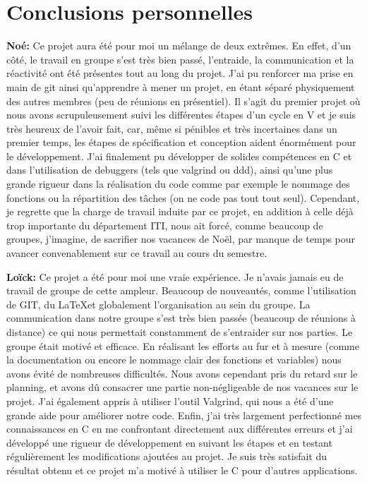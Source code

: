 \documentclass{article}
\begin{document}
\clearpage
\section{Conclusions personnelles}


\textbf{Noé:} 
Ce projet aura été pour moi un mélange de deux extrêmes.
En effet, d'un côté, le travail en groupe s'est très bien passé, l'entraide, la communication et la réactivité ont été présentes tout au long du projet.
J'ai pu renforcer ma prise en main de git ainsi qu'apprendre à mener un projet, en étant séparé physiquement des autres membres (peu de réunions en présentiel).
Il s'agit du premier projet où nous avons scrupuleusement suivi les différentes étapes d'un cycle en V et je suis très heureux de l'avoir fait, car, même si pénibles et très incertaines dans un premier temps, les étapes de spécification et conception aident énormément pour le développement.
J'ai finalement pu développer de solides compétences en C et dans l'utilisation de debuggers (tels que valgrind ou ddd), ainsi qu'une plus grande rigueur dans la réalisation du code comme par exemple le nommage des fonctions ou la répartition des tâches (on ne code pas tout tout seul).
Cependant, je regrette que la charge de travail induite par ce projet, en addition à celle déjà trop importante du département ITI, nous ait forcé, comme beaucoup de groupes, j'imagine, de sacrifier nos vacances de Noël, par manque de temps pour avancer convenablement sur ce travail au cours du semestre.
\medskip

\textbf{Loïck:}
Ce projet a été pour moi une vraie expérience. Je n’avais jamais eu de travail de groupe de cette ampleur. Beaucoup de nouveautés, comme l’utilisation de GIT, du \LaTeX et globalement l’organisation au sein du groupe. La communication dans notre groupe s’est très bien passée (beaucoup de réunions à distance) ce qui nous permettait constamment de s’entraider sur nos parties. Le groupe était motivé et efficace. En réalisant les efforts au fur et à mesure (comme la documentation ou encore le nommage clair des fonctions et variables) nous avons évité de nombreuses difficultés. Nous avons cependant pris du retard sur le planning, et avons dû consacrer une partie non-négligeable de nos vacances sur le projet.
J’ai également appris à utiliser l’outil Valgrind, qui nous a été d’une grande aide pour améliorer notre code. Enfin, j’ai très largement perfectionné mes connaissances en C en me confrontant directement aux différentes erreurs et j’ai développé une rigueur de développement en suivant les étapes et en testant régulièrement les modifications ajoutées au projet. Je suis très satisfait du résultat obtenu et ce projet m’a motivé à utiliser le C pour d’autres applications.
\medskip
\end{document}
